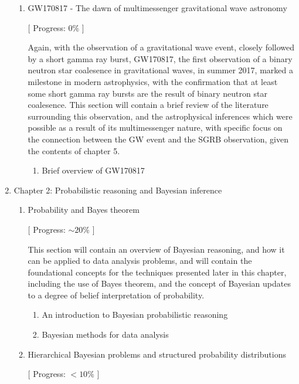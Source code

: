 \documentclass[openleft]{kentigern}
\theoremstyle{definition}
\begin{document}
\begin{enumerate}
\begin{enumerate}
   
 \item GW170817 - The dawn of multimessenger gravitational wave astronomy
  
   [ Progress: $0\%$ ]

   Again, with the observation of a gravitational wave event, closely
   followed by a short gamma ray burst, GW170817, the first
   observation of a binary neutron star coalesence in gravitational
   waves, in summer 2017, marked a milestone in modern astrophysics,
   with the confirmation that at least some short gamma ray bursts are
   the result of binary neutron star coalesence. This section will
   contain a brief review of the literature surrounding this
   observation, and the astrophysical inferences which were possible
   as a result of its multimessenger nature, with specific focus on
   the connection between the GW event and the SGRB observation, given
   the contents of chapter 5.
   \begin{enumerate}
   \item Brief overview of GW170817
   \end{enumerate}
  \end{enumerate}

  
\item Chapter 2: Probabilistic reasoning and Bayesian inference
  \begin{enumerate}
\item Probability and Bayes theorem

  [ Progress: $\sim20\%$ ]

   This section will contain an overview of Bayesian reasoning, and
   how it can be applied to data analysis problems, and will contain
   the foundational concepts for the techniques presented later in
   this chapter, including the use of Bayes theorem, and the concept
   of Bayesian updates to a degree of belief interpretation of
   probability.
   \begin{enumerate}
   \item An introduction to Bayesian probabilistic reasoning    
   \item Bayesian methods for data analysis
   \end{enumerate}
   
\item Hierarchical Bayesian problems and structured probability distributions

  [ Progress: $<10\%$ ]
  

\end{enumerate}
\end{enumerate}
\end{document}
